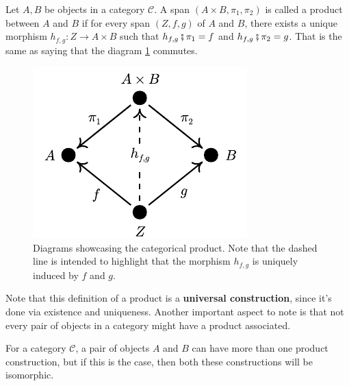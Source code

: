 \begin{definition}
	Let $A,B$ be objects in a  category $\mathcal C$. A span $(A\times B, \pi_1, \pi_2)$
	is called a product between $A$ and $B$ if for every span $(Z, f, g)$ of $A$ and $B$,
	there exists a unique morphism $h_{f,g}:Z \to A \times B$ such that
	$h_{f,g} \fatsemi \pi_1 = f$ and $h_{f,g} \fatsemi \pi_2 = g$. That is the same
	as saying that the diagram \ref{fig:Product} commutes.
\end{definition}

\begin{figure}[H]
	\begin{center}
		\includegraphics{./notebooks/CategoricalProduct.pdf}
	\end{center}
	\caption{Diagrams showcasing the categorical product. Note that the dashed line
		is intended to highlight that the morphism $h_{f,g}$ is uniquely induced by $f$ and $g$.}
	\label{fig:Product}
\end{figure}

Note that this definition of a product is a \textbf{universal construction}, since
it's done via existence and uniqueness.
Another important aspect to note is that not every pair of objects in a category might have a
product associated.

\begin{theorem}
	For a category $\mathcal C$, a pair of objects $A$ and $B$ can have more than one
	product construction, but if this is the case, then both these constructions will be
	isomorphic.
\end{theorem}


